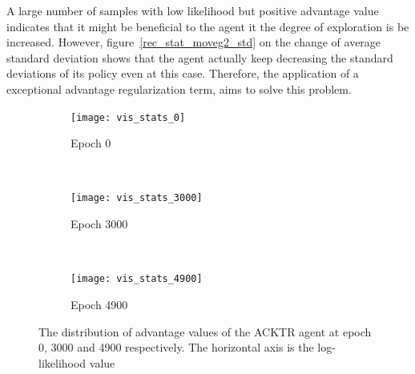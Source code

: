 A large number of samples with low likelihood but positive advantage value indicates that it might be beneficial to the agent it the degree of exploration is be increased. However, figure~\ref{rec_stat_moveg2_std} on the change of average standard deviation shows that the agent actually keep decreasing the standard deviations of its policy even at this case. Therefore, the application of a exceptional advantage regularization term, aims to solve this problem.
\begin{figure}[!htbp]
	\centering
	\begin{subfigure}[t]{0.5\textwidth}
		\centering
		\texttt{[image: vis\_stats\_0]}
		\caption{Epoch 0}
			\label{vis_stats_0}
	\end{subfigure}%
	~ 
	\begin{subfigure}[t]{0.5\textwidth}
		\centering
		\texttt{[image: vis\_stats\_3000]}
		\caption{Epoch 3000}
			\label{vis_stats_3000}
	\end{subfigure}
	~ 
	\begin{subfigure}[t]{0.7\textwidth}
		\centering
		\texttt{[image: vis\_stats\_4900]}
		\caption{Epoch 4900}
		\label{vis_stats_4900}
	\end{subfigure}
	\caption{The distribution of advantage values of the ACKTR agent at epoch 0, 3000 and 4900 respectively. The horizontal axis is the log-likelihood value}
\end{figure}
%
%

